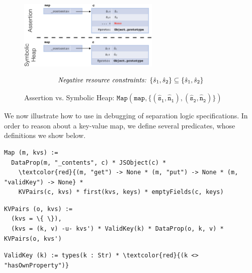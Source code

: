 \begin{figure}[!h]
\centering
\includegraphics[width=0.6\textwidth]{figures/symbvsass.png}

\vspace*{-0.7cm}
{\small $$
\text{\emph{Negative resource constraints: }} \{ \hat{s}_1, \hat{s}_2 \} \subseteq \{ \hat{s}_1, \hat{s}_2 \}
$$}
\vspace{-0.8cm}
\caption{Assertion vs. Symbolic Heap: {\small$\mathtt{Map(map, \{ (\hat{s}_1, \hat{n}_1), (\hat{s}_2, \hat{n}_2) \} )}$}}\label{fig:symb:state:versus:assertion}
\vspace{-0.5cm}
\end{figure}

We now illustrate how to use \jilette in debugging of separation logic specifications. 
In order to reason about a key-value map, we define several predicates, whose definitions we show below.

\begin{Verbatim}[fontsize=\footnotesize,commandchars=\\\{\}]
Map (m, kvs) := 
  DataProp(m, "_contents", c) * JSObject(c) * 
    \textcolor{red}{(m, "get") -> None * (m, "put") -> None * (m, "validKey") -> None} * 
    KVPairs(c, kvs) * first(kvs, keys) * emptyFields(c, keys)
\end{Verbatim}
 \begin{Verbatim}[fontsize=\footnotesize,commandchars=\\\{\}]
KVPairs (o, kvs) := 
  (kvs = \{ \}),
  (kvs = (k, v) -u- kvs') * ValidKey(k) * DataProp(o, k, v) * KVPairs(o, kvs')
\end{Verbatim}
\begin{Verbatim}[fontsize=\footnotesize,commandchars=\\\{\}]
ValidKey (k) := types(k : Str) * \textcolor{red}{(k <> "hasOwnProperty")}
\end{Verbatim}

